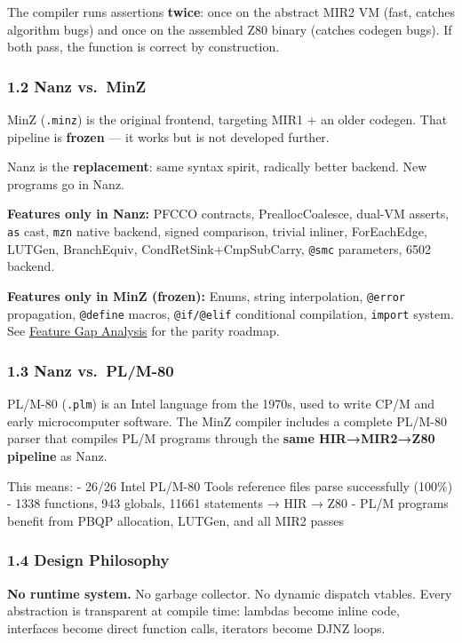 \documentclass[
  11pt,
  a4paper,
]{report}
\begin{document}
The compiler runs assertions \textbf{twice}: once on the abstract MIR2
VM (fast, catches algorithm bugs) and once on the assembled Z80 binary
(catches codegen bugs). If both pass, the function is correct by
construction.

\subsubsection{1.2 Nanz vs.~MinZ}\label{nanz-vs.-minz}

MinZ (\texttt{.minz}) is the original frontend, targeting MIR1 + an
older codegen. That pipeline is \textbf{frozen} --- it works but is not
developed further.

Nanz is the \textbf{replacement}: same syntax spirit, radically better
backend. New programs go in Nanz.

\textbf{Features only in Nanz:} PFCCO contracts, PreallocCoalesce,
dual-VM asserts, \texttt{as} cast, \texttt{mzn} native backend, signed
comparison, trivial inliner, ForEachEdge, LUTGen, BranchEquiv,
CondRetSink+CmpSubCarry, \texttt{@smc} parameters, 6502 backend.

\textbf{Features only in MinZ (frozen):} Enums, string interpolation,
\texttt{@error} propagation, \texttt{@define} macros, \texttt{@if/@elif}
conditional compilation, \texttt{import} system. See
\href{MinZ_vs_Nanz_Feature_Gap.md}{Feature Gap Analysis} for the parity
roadmap.

\subsubsection{1.3 Nanz vs.~PL/M-80}\label{nanz-vs.-plm-80}

PL/M-80 (\texttt{.plm}) is an Intel language from the 1970s, used to
write CP/M and early microcomputer software. The MinZ compiler includes
a complete PL/M-80 parser that compiles PL/M programs through the
\textbf{same HIR→MIR2→Z80 pipeline} as Nanz.

This means: - 26/26 Intel PL/M-80 Tools reference files parse
successfully (100\%) - 1338 functions, 943 globals, 11661 statements →
HIR → Z80 - PL/M programs benefit from PBQP allocation, LUTGen, and all
MIR2 passes

\subsubsection{1.4 Design Philosophy}\label{design-philosophy}

\textbf{No runtime system.} No garbage collector. No dynamic dispatch
vtables. Every abstraction is transparent at compile time: lambdas
become inline code, interfaces become direct function calls, iterators
become DJNZ loops.
\end{document}
